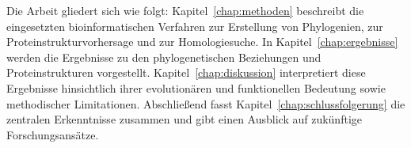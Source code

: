 Die Arbeit gliedert sich wie folgt: Kapitel~\ref{chap:methoden} beschreibt die eingesetzten bioinformatischen Verfahren zur Erstellung von Phylogenien, zur Proteinstrukturvorhersage und zur Homologiesuche. In Kapitel~\ref{chap:ergebnisse} werden die Ergebnisse zu den phylogenetischen Beziehungen und Proteinstrukturen vorgestellt. Kapitel~\ref{chap:diskussion} interpretiert diese Ergebnisse hinsichtlich ihrer evolutionären und funktionellen Bedeutung sowie methodischer Limitationen. Abschließend fasst Kapitel~\ref{chap:schlussfolgerung} die zentralen Erkenntnisse zusammen und gibt einen Ausblick auf zukünftige Forschungsansätze.